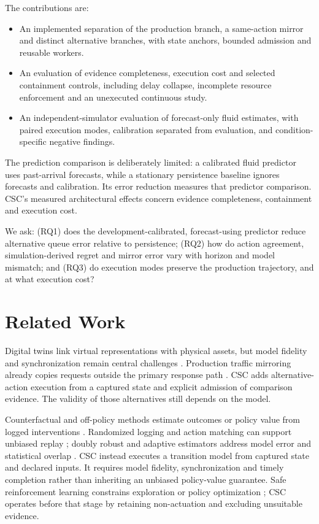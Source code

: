 \documentclass[conference,letterpaper]{IEEEtran}
\begin{document}
The contributions are:
\begin{itemize}
\item An implemented separation of the production branch, a same-action mirror
and distinct alternative branches, with state anchors, bounded admission and
reusable workers.
\item An evaluation of evidence completeness, execution cost and selected
containment controls, including delay collapse, incomplete resource enforcement
and an unexecuted continuous study.
\item An independent-simulator evaluation of forecast-only fluid estimates,
with paired execution modes, calibration separated from evaluation, and
condition-specific negative findings.
\end{itemize}
The prediction comparison is deliberately limited: a calibrated fluid predictor
uses past-arrival forecasts, while a stationary persistence baseline ignores
forecasts and calibration. Its error reduction measures that predictor comparison.
CSC's measured architectural effects concern evidence completeness, containment
and execution cost.

We ask: (RQ1) does the development-calibrated, forecast-using predictor reduce
alternative queue error relative to persistence; (RQ2) how do action agreement, simulation-derived regret
and mirror error vary with horizon and model mismatch; and (RQ3) do execution
modes preserve the production trajectory, and at what execution cost?

\section{Related Work}
Digital twins link virtual representations with physical assets, but model
fidelity and synchronization remain central challenges
\cite{tao2019digital,fuller2020digital}. Production traffic mirroring already
copies requests outside the primary response path \cite{istio-mirroring}.
CSC adds alternative-action execution from a captured state and explicit
admission of comparison evidence. The validity of those alternatives still
depends on the model.

Counterfactual and off-policy methods estimate outcomes or policy value from
logged interventions \cite{bottou2013counterfactual}. Randomized logging and
action matching can support unbiased replay \cite{li2011unbiased}; doubly robust
and adaptive estimators address model error and statistical overlap
\cite{jiang2016doubly,wang2017optimal}. CSC instead executes a transition model
from captured state and declared inputs. It requires model fidelity,
synchronization and timely completion rather than inheriting an unbiased
policy-value guarantee. Safe reinforcement learning constrains exploration or
policy optimization \cite{garcia2015safe,achiam2017cpo}; CSC operates before
that stage by retaining non-actuation and excluding unsuitable evidence.
\end{document}
